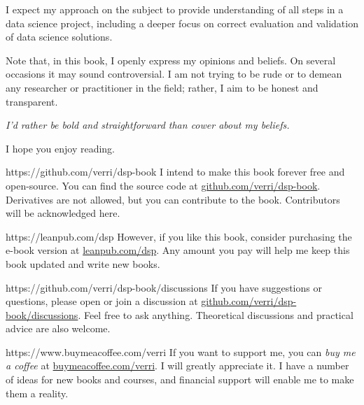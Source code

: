 I expect my approach on the subject to provide understanding of all steps in a data
science project, including a deeper focus on correct evaluation and validation of data
science solutions.

Note that, in this book, I openly express my opinions and beliefs. On several occasions it
may sound controversial.  I am not trying to be rude or to demean any researcher or
practitioner in the field; rather, I aim to be honest and transparent.

\vspace{1em}
\emph{I'd rather be bold and straightforward than cower about my beliefs.}
\vspace{1em}

I hope you enjoy reading.

\newpage

\begin{parwithqr}{https://github.com/verri/dsp-book}
  I intend to make this book forever free and open-source. You can find the source code at
  \href{\aurl}{github.com/verri/dsp-book}. Derivatives are not allowed, but you can
  contribute to the book. Contributors will be acknowledged here.
\end{parwithqr}

\vspace{3em}

\begin{lparwithqr}{https://leanpub.com/dsp}
  However, if you like this book, consider purchasing the e-book version at
  \href{\aurl}{leanpub.com/dsp}. Any amount you pay will help me keep this book updated
  and write new books.
\end{lparwithqr}

\vspace{3em}

\begin{parwithqr}{https://github.com/verri/dsp-book/discussions}
  If you have suggestions or questions, please open or join a discussion at
  \href{\aurl}{github.com/verri/dsp-book/discussions}. Feel free to ask anything.
  Theoretical discussions and practical advice are also welcome.
\end{parwithqr}

\vspace{3em}

\begin{lparwithqr}{https://www.buymeacoffee.com/verri}
  If you want to support me, you can \emph{buy me a coffee} at
  \href{\aurl}{buymeacoffee.com/verri}. I will greatly appreciate it.  I have a number of
  ideas for new books and courses, and financial support will enable me to make them a
  reality.
\end{lparwithqr}

